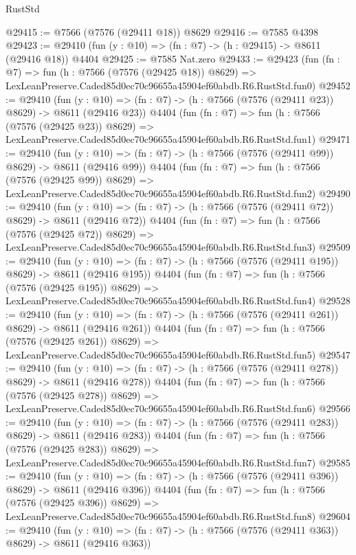 \begin{lexlean}{RustStd}
\begin{coremodule}
@29415 := @7566 (@7576 (@29411 @18)) @8629
@29416 := @7585 @4398
@29423 := @29410 (fun (y : @10) => (fn : @7) -> (h : @29415) -> @8611 (@29416 @18)) @4404
@29425 := @7585 Nat.zero
@29433 := @29423
    (fun (fn : @7) =>
    fun (h : @7566 (@7576 (@29425 @18)) @8629) =>
    LexLeanPreserve.Caded85d0ec70c96655a45904ef60abdb.R6.RustStd.fun0)
@29452 := @29410
    (fun (y : @10) => (fn : @7) -> (h : @7566 (@7576 (@29411 @23)) @8629) -> @8611 (@29416 @23))
    @4404
    (fun (fn : @7) =>
    fun (h : @7566 (@7576 (@29425 @23)) @8629) =>
    LexLeanPreserve.Caded85d0ec70c96655a45904ef60abdb.R6.RustStd.fun1)
@29471 := @29410
    (fun (y : @10) => (fn : @7) -> (h : @7566 (@7576 (@29411 @99)) @8629) -> @8611 (@29416 @99))
    @4404
    (fun (fn : @7) =>
    fun (h : @7566 (@7576 (@29425 @99)) @8629) =>
    LexLeanPreserve.Caded85d0ec70c96655a45904ef60abdb.R6.RustStd.fun2)
@29490 := @29410
    (fun (y : @10) => (fn : @7) -> (h : @7566 (@7576 (@29411 @72)) @8629) -> @8611 (@29416 @72))
    @4404
    (fun (fn : @7) =>
    fun (h : @7566 (@7576 (@29425 @72)) @8629) =>
    LexLeanPreserve.Caded85d0ec70c96655a45904ef60abdb.R6.RustStd.fun3)
@29509 := @29410
    (fun (y : @10) => (fn : @7) -> (h : @7566 (@7576 (@29411 @195)) @8629) -> @8611 (@29416 @195))
    @4404
    (fun (fn : @7) =>
    fun (h : @7566 (@7576 (@29425 @195)) @8629) =>
    LexLeanPreserve.Caded85d0ec70c96655a45904ef60abdb.R6.RustStd.fun4)
@29528 := @29410
    (fun (y : @10) => (fn : @7) -> (h : @7566 (@7576 (@29411 @261)) @8629) -> @8611 (@29416 @261))
    @4404
    (fun (fn : @7) =>
    fun (h : @7566 (@7576 (@29425 @261)) @8629) =>
    LexLeanPreserve.Caded85d0ec70c96655a45904ef60abdb.R6.RustStd.fun5)
@29547 := @29410
    (fun (y : @10) => (fn : @7) -> (h : @7566 (@7576 (@29411 @278)) @8629) -> @8611 (@29416 @278))
    @4404
    (fun (fn : @7) =>
    fun (h : @7566 (@7576 (@29425 @278)) @8629) =>
    LexLeanPreserve.Caded85d0ec70c96655a45904ef60abdb.R6.RustStd.fun6)
@29566 := @29410
    (fun (y : @10) => (fn : @7) -> (h : @7566 (@7576 (@29411 @283)) @8629) -> @8611 (@29416 @283))
    @4404
    (fun (fn : @7) =>
    fun (h : @7566 (@7576 (@29425 @283)) @8629) =>
    LexLeanPreserve.Caded85d0ec70c96655a45904ef60abdb.R6.RustStd.fun7)
@29585 := @29410
    (fun (y : @10) => (fn : @7) -> (h : @7566 (@7576 (@29411 @396)) @8629) -> @8611 (@29416 @396))
    @4404
    (fun (fn : @7) =>
    fun (h : @7566 (@7576 (@29425 @396)) @8629) =>
    LexLeanPreserve.Caded85d0ec70c96655a45904ef60abdb.R6.RustStd.fun8)
@29604 := @29410
    (fun (y : @10) => (fn : @7) -> (h : @7566 (@7576 (@29411 @363)) @8629) -> @8611 (@29416 @363))

\end{coremodule}
\end{lexlean}

